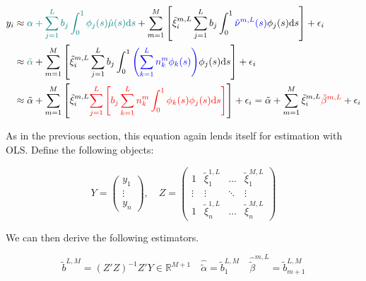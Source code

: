 \documentclass[11pt,twoside,a4paper]{article}
\begin{document}
	\begin{equation}
		\begin{split}
			y_i & \approx {\color{teal}\alpha + \sum_{j = 1}^{L} b_j \int_{0}^{1} \phi_j(s) \hat{\mu}(s) \mathrm{d}s} +  \sum_{m  = 1}^{M} \left[ \tilde{\xi}^{m,L}_{i} \sum_{j = 1}^{L} b_j \int_{0}^{1} {\color{blue}\hat{\nu}^{m,L}(s)} \phi_j(s) \mathrm{d}s \right] + \epsilon_i \\
			& \approx {\color{teal} \tilde{\alpha}} + \sum_{m  = 1}^{M} \left[ \tilde{\xi}^{m,L}_{i} \sum_{j = 1}^{L} b_j \int_{0}^{1}{\color{blue}\left(\sum_{k = 1}^{L} n_{k}^m \phi_{k}(s)\right)} \phi_j(s) \mathrm{d}s \right] + \epsilon_i \\
			& \approx \tilde{\alpha} + \sum_{m  = 1}^{M} \left[ \tilde{\xi}^{m,L}_{i} {\color{red}\sum_{j = 1}^{L} \left[ b_j \sum_{k = 1}^{L} n_{k}^m \int_{0}^{1} \phi_{k}(s) \phi_j(s) \mathrm{d}s \right]} \right]+ \epsilon_i
			= \tilde{\alpha} + \sum_{m  = 1}^{M} \tilde{\xi}^{m,L}_{i} {\color{red}\tilde{\beta}^{m,L}}+ \epsilon_i
		\end{split}
	\end{equation}

	As in the previous section, this equation again lends itself for estimation with OLS. Define the following objects:
	
	\begin{equation}
		Y = \begin{pmatrix}
			y_1 \\ \vdots \\ y_n
			\end{pmatrix}, \quad
		Z = \begin{pmatrix}
			1 & \tilde{\xi}^{1,L}_{1} & \dots & \tilde{\xi}^{M,L}_{1} \\
			\vdots & \vdots & \ddots & \vdots \\
			1 & \tilde{\xi}^{1,L}_{n} & \dots & \tilde{\xi}^{M,L}_{n}
			\end{pmatrix}
	\end{equation}
	
	We can then derive the following estimators.
	
	\begin{equation}
			\tilde{b}^{L,M} = \left(Z'Z\right)^{-1}Z'Y \in \mathbb{R}^{M+1} \quad \hat{\tilde{\alpha}} = \tilde{b}_{1}^{L,M} \quad \hat{\tilde{\beta}}^{m,L} = \tilde{b}^{L,M}_{m+1}
	\end{equation}
	
\end{document}
